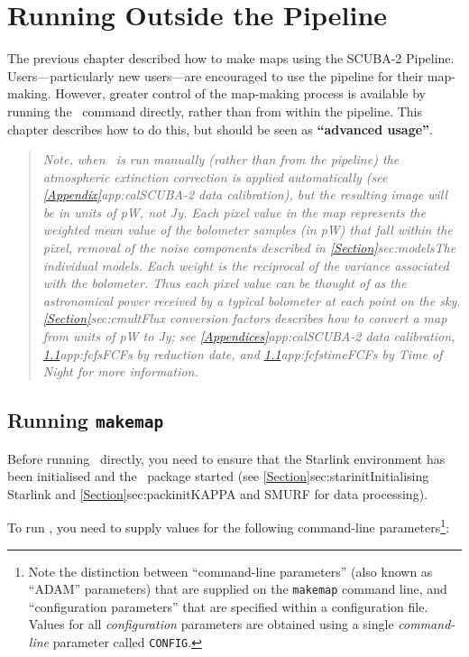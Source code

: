 \chapter{Running  Outside the Pipeline}
\label{sec:manual}

The previous chapter described how to make maps using the SCUBA-2 Pipeline.
Users---particularly new users---are encouraged to use the pipeline for
their map-making. However, greater control of the map-making
process is available by running the \makemap\ command directly, rather
than from within the pipeline. This chapter describes how to do this, but
should be seen as \textbf{``advanced usage''}.

\begin{quote}
\emph{
Note, when \makemap\ is run manually (rather than from the pipeline) the
atmospheric extinction correction is applied automatically (see
\cref{Appendix}{app:cal}{SCUBA-2 data calibration}),
but the resulting image will be in units of pW, not Jy. Each pixel value
in the map represents the weighted mean value of the bolometer samples
(in pW) that fall within the pixel, removal of the noise components
described in \cref{Section}{sec:models}{The individual models}.  Each
weight is the reciprocal of the variance associated with the bolometer.
Thus each pixel value can be thought of as the astronomical power
received by a typical bolometer at each point on the sky.
\cref{Section}{sec:cmult}{Flux conversion factors} describes how to
convert a map from units of pW to Jy; see
\cref{Appendices}{app:cal}{SCUBA-2 data calibration},
\cref{}{app:fcfs}{FCFs by reduction date}, and
\cref{}{app:fcfstime}{FCFs by Time of Night} for more information.
}
\end{quote}

\section{Running \texttt{makemap}}

Before running \makemap\ directly, you need to ensure that the Starlink
environment has been initialised and the \smurf\ package started (see
\cref{Section}{sec:starinit}{Initialising Starlink} and
\cref{Section}{sec:packinit}{KAPPA and SMURF for data processing}).

To run \makemap, you  need to supply values for the following
command-line parameters\footnote{Note the distinction between
``command-line parameters'' (also known as ``ADAM'' parameters) that are
supplied on the \texttt{makemap} command line, and ``configuration parameters''
that are specified within a configuration file. Values for all
\emph{configuration} parameters are obtained using a single \emph{command-line}
parameter called \texttt{CONFIG}.}:

